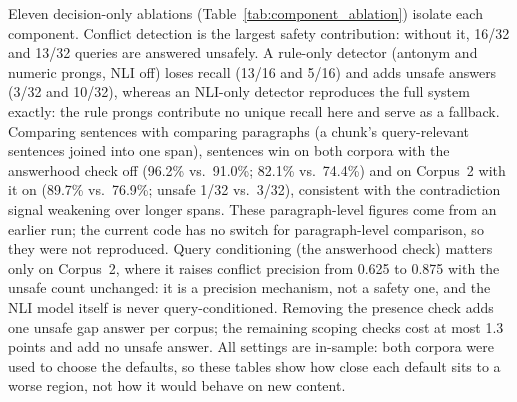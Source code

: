 \documentclass[conference]{IEEEtran}
\begin{document}
Eleven decision-only ablations (Table~\ref{tab:component_ablation}) isolate
each component. Conflict detection is the largest safety contribution:
without it, 16/32 and 13/32 queries are answered unsafely. A rule-only
detector (antonym and numeric prongs, NLI off) loses recall (13/16 and
5/16) and adds unsafe answers (3/32 and 10/32), whereas an NLI-only
detector reproduces the full system exactly: the rule prongs contribute no
unique recall here and serve as a fallback. Comparing sentences with
comparing paragraphs (a chunk's query-relevant sentences joined into one
span), sentences win on both corpora with the answerhood check off
(96.2\% vs.\ 91.0\%; 82.1\% vs.\ 74.4\%) and on Corpus~2 with it on
(89.7\% vs.\ 76.9\%; unsafe 1/32 vs.\ 3/32), consistent with the
contradiction signal weakening over longer spans. These paragraph-level
figures come from an earlier run; the current code has no switch for
paragraph-level comparison, so they were not reproduced. Query conditioning (the
answerhood check) matters only on Corpus~2, where it raises conflict
precision from 0.625 to 0.875 with the unsafe count unchanged: it is a
precision mechanism, not a safety one, and the NLI model itself is never
query-conditioned. Removing the presence check adds one unsafe gap answer
per corpus; the remaining scoping checks cost at most 1.3 points and add no
unsafe answer. All settings are in-sample: both corpora were used to choose
the defaults, so these tables show how close each default sits to a worse
region, not how it would behave on new content.
\end{document}
